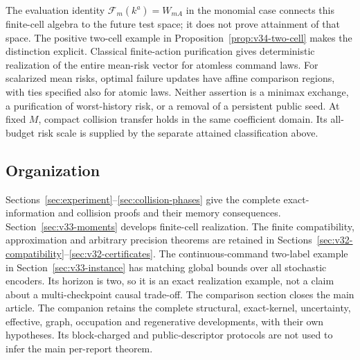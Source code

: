 The evaluation identity $\mathcal F_m(k^a)=W_{mA}$ in the monomial
case connects this finite-cell algebra to the future test space; it
does not prove attainment of that space. The positive two-cell example
in Proposition~\ref{prop:v34-two-cell} makes the distinction explicit.
Classical finite-action purification \cite{DWW1951} gives deterministic
realization of the entire mean-risk vector for atomless command laws.
For scalarized mean risks, optimal failure updates have affine comparison
regions, with ties specified also for atomic laws. Neither assertion
is a minimax exchange, a purification of worst-history risk, or a
removal of a persistent public seed. At fixed $M$, compact collision
transfer holds in the same coefficient domain. Its all-budget risk
scale is supplied by the separate attained classification above.

\subsection{Organization}
Sections~\ref{sec:experiment}--\ref{sec:collision-phases} give the
complete exact-information and collision proofs and their memory
consequences. Section~\ref{sec:v33-moments} develops finite-cell
realization. The finite compatibility, approximation and arbitrary
precision theorems are retained in
Sections~\ref{sec:v32-compatibility}--\ref{sec:v32-certificates}.
The continuous-command two-label example in
Section~\ref{sec:v33-instance} has matching global bounds over all
stochastic encoders. Its horizon is two, so it is an exact realization
example, not a claim about a multi-checkpoint causal trade-off.
The comparison section closes the main article. The companion retains
the complete structural, exact-kernel, uncertainty, effective, graph,
occupation and regenerative developments, with their own hypotheses.
Its block-charged and public-descriptor protocols are not used to infer
the main per-report theorem.
